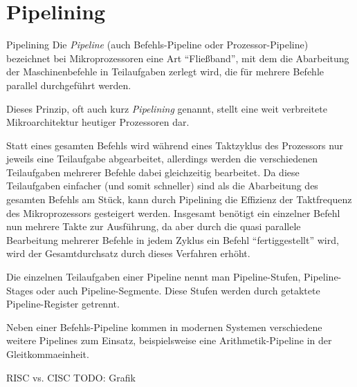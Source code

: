 
\section{Pipelining}

\begin{defi}{Pipelining}
    Die \emph{Pipeline} (auch Befehls-Pipeline oder Prozessor-Pipeline) bezeichnet bei Mikroprozessoren eine Art \enquote{Fließband}, mit dem die Abarbeitung der Maschinenbefehle in Teilaufgaben zerlegt wird, die für mehrere Befehle parallel durchgeführt werden.

    Dieses Prinzip, oft auch kurz \emph{Pipelining} genannt, stellt eine weit verbreitete Mikroarchitektur heutiger Prozessoren dar.

    Statt eines gesamten Befehls wird während eines Taktzyklus des Prozessors nur jeweils eine Teilaufgabe abgearbeitet, allerdings werden die verschiedenen Teilaufgaben mehrerer Befehle dabei gleichzeitig bearbeitet.
    Da diese Teilaufgaben einfacher (und somit schneller) sind als die Abarbeitung des gesamten Befehls am Stück, kann durch Pipelining die Effizienz der Taktfrequenz des Mikroprozessors gesteigert werden.
    Insgesamt benötigt ein einzelner Befehl nun mehrere Takte zur Ausführung, da aber durch die quasi parallele Bearbeitung mehrerer Befehle in jedem Zyklus ein Befehl \enquote{fertiggestellt} wird, wird der Gesamtdurchsatz durch dieses Verfahren erhöht.

    Die einzelnen Teilaufgaben einer Pipeline nennt man Pipeline-Stufen, Pipeline-Stages oder auch Pipeline-Segmente.
    Diese Stufen werden durch getaktete Pipeline-Register getrennt.

    Neben einer Befehls-Pipeline kommen in modernen Systemen verschiedene weitere Pipelines zum Einsatz, beispielsweise eine Arithmetik-Pipeline in der Gleitkommaeinheit.
\end{defi}

\begin{example}[Pipelining]{RISC vs. CISC}
    TODO: Grafik
\end{example}


